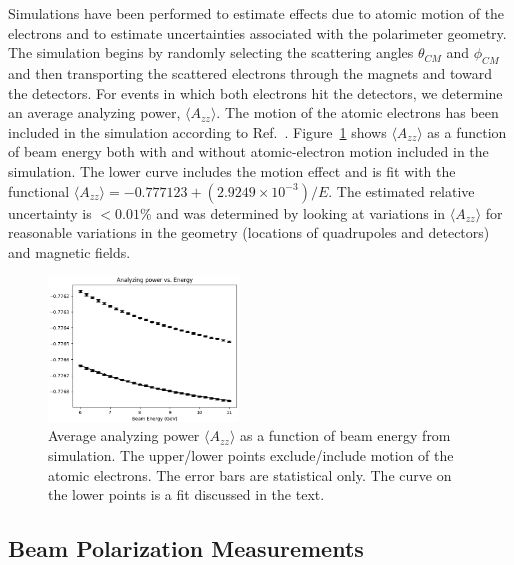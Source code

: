 Simulations have been performed to estimate effects due to atomic motion of the electrons and to estimate
uncertainties associated with the polarimeter geometry. The simulation begins by randomly selecting the
scattering angles $\theta_{CM}$ and $\phi_{CM}$ and then transporting the scattered electrons through the
magnets and toward the detectors. For events in which both electrons hit the detectors, we determine an
average analyzing power, $\langle A_{zz}\rangle$. The motion of the atomic electrons has been included in the
simulation according to Ref.~\cite{levchuk94}. Figure~\ref{fig-Azz} shows $\langle A_{zz}\rangle$ as a function
of beam energy both with and without atomic-electron motion included in the simulation. The lower curve includes
the motion effect and is fit with the functional $\langle A_{zz}\rangle= -0.777123+(2.9249\times 10^{-3})/E$. The
estimated relative uncertainty is $<0.01$\% and was determined by looking at variations in $\langle A_{zz}\rangle$
for reasonable variations in the geometry (locations of quadrupoles and detectors) and magnetic fields.
\begin{figure}[ht]
 \begin{center}
  \includegraphics[width=0.45\textwidth]{Azz.png}
 \end{center}
 \caption{Average analyzing power $\langle A_{zz}\rangle$ as a function of beam energy from simulation. The
   upper/lower points exclude/include motion of the atomic electrons. The error bars are statistical only. The
   curve on the lower points is a fit discussed in the text.}
 \label{fig-Azz}
\end{figure}

\subsection{Beam Polarization Measurements}
\label{sec-SpinDance}

